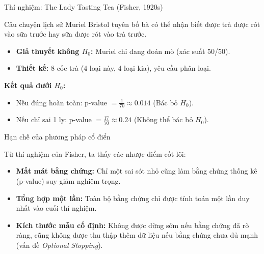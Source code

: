\begin{frame}{Thí nghiệm: The Lady Tasting Tea (Fisher, 1920s)}

\begin{block}{Câu chuyện lịch sử}
Muriel Bristol tuyên bố bà có thể nhận biết được trà được rót vào sữa trước hay sữa được rót vào trà trước.
\end{block}

\begin{itemize}
    \item \textbf{Giả thuyết không $H_0$:} Muriel chỉ đang đoán mò (xác suất 50/50).
    \item \textbf{Thiết kế:} 8 cốc trà (4 loại này, 4 loại kia), yêu cầu phân loại.
\end{itemize}

\vspace{0.2cm}
\textbf{Kết quả dưới $H_0$:}
\begin{itemize}
    \item Nếu đúng hoàn toàn: p-value $= \frac{1}{70} \approx 0.014$ (Bác bỏ $H_0$).
    \item Nếu chỉ sai 1 ly: p-value $= \frac{17}{70} \approx 0.24$ (Không thể bác bỏ $H_0$).
\end{itemize}

\end{frame}

\begin{frame}{Hạn chế của phương pháp cổ điển}

Từ thí nghiệm của Fisher, ta thấy các nhược điểm cốt lõi:

\begin{itemize}
    \item \textbf{Mất mát bằng chứng:} Chỉ một sai sót nhỏ cũng làm bằng chứng thống kê (p-value) suy giảm nghiêm trọng.
    \item \textbf{Tổng hợp một lần:} Toàn bộ bằng chứng chỉ được tính toán một lần duy nhất vào cuối thí nghiệm.
    \item \textbf{Kích thước mẫu cố định:} Không được dừng sớm nếu bằng chứng đã rõ ràng, cũng không được thu thập thêm dữ liệu nếu bằng chứng chưa đủ mạnh (vấn đề \textit{Optional Stopping}).
\end{itemize}

\end{frame}

